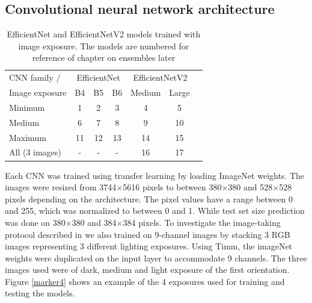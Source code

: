 \documentclass[10pt,letterpaper]{article}
\begin{document}
\subsection*{Convolutional neural network architecture}

\begin{table}[hbt!]
\caption{EfficientNet and EfficientNetV2 models trained with image exposure.
The models are numbered for reference of chapter on ensembles later}
\begin{tabular}{ |l|c|c|c|c|c|c| }
\hline
CNN family / & \multicolumn{3}{c|}{EfficientNet} & \multicolumn{2}{c|}{EfficientNetV2} \\
Image exposure & B4 & B5 & B6 &Medium &Large  \\ 
\hline
Minimum & 1 & 2 & 3 & 4 & 5  \\ 
Medium & 6 & 7 & 8 & 9 & 10  \\ 
Maximum & 11 & 12 & 13 & 14 & 15  \\ 
All (3 images) & - & - & - & 16 & 17  \\ 
\hline
\end{tabular}
\label{table1}
\end{table}
Each CNN was trained using transfer learning by loading ImageNet weights. The images were resized from 3744$\times$5616 pixels to between 380$\times$380 and 528$\times$528 pixels
depending on the architecture. The pixel values have a range between 0 and 255, which was normalized to between 0 and 1. While test set size prediction was done on 380$\times$380 and 384$\times$384 pixels. To investigate the image-taking protocol described in \citep{codOtolithsMyers} we also trained on 9-channel images by stacking 3 RGB images representing 3 different lighting exposures. Using Timm\citep{rw2019timm}, the imageNet weights were duplicated on the input layer to accommodate 9 channels. The three images used were of dark, medium and light exposure of the first orientation. Figure \ref{marker4} shows an example of the 4 exposures used for training and testing the models. 
\end{document}
